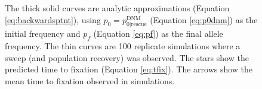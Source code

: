 \documentclass[]{article}
\begin{document}
\begin{figure}[htbp]
{The thick solid curves are analytic approximations (Equation \ref{eq:backwardsptnt}), using $p_0 = p_{0|\mathrm{rescue}}^\mathrm{DNM}$ (Equation \ref{eq:p0dnm}) as the initial frequency and $p_f$ (Equation \ref{eq:pf}) as the final allele frequency.
The thin curves are 100 replicate simulations where a sweep (and population recovery) was observed.
The stars show the predicted time to fixation (Equation \ref{eq:tfix}).
The arrows show the mean time to fixation observed in simulations. 
}%
\label{fig:rescueDNM_dynamics}
\end{figure}

\begin{figure}[htb]
\centering
{}
\end{figure}
\end{document}
